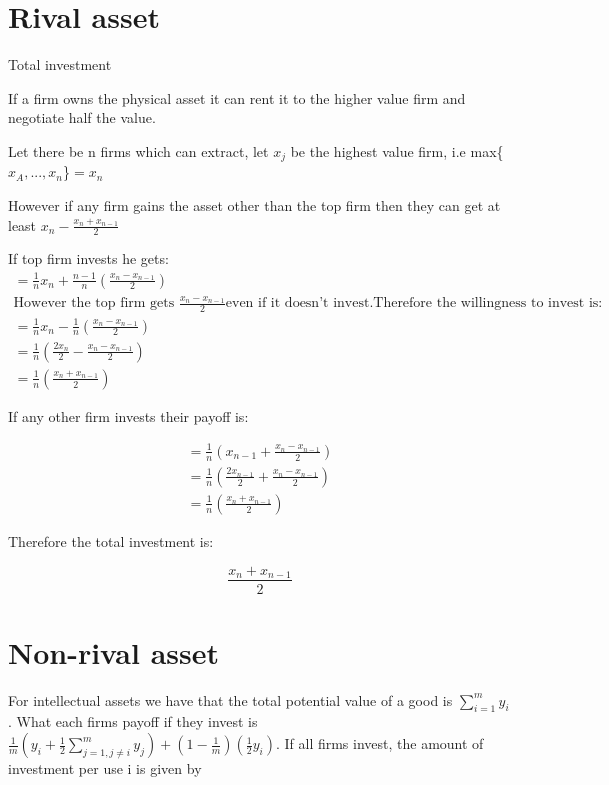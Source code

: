 \documentclass{article}
\begin{document}
\section*{Rival asset}
Total investment 

If a firm owns the physical asset it can rent it to the higher value firm and negotiate half the value. 

Let there be n firms which can extract, let $x_j$ be the highest value firm, i.e max\{$x_A,...,x_n$\}$=x_n$

However if any firm gains the asset other than the top firm then they can get at least $x_n-\frac{x_n+x_{n-1}}{2}$

If top firm invests he gets: 
\begin{align*}
=\frac{1}{n}x_n+\frac{n-1}{n}( \frac{x_n-x_{n-1}}{2} ) \\
\text{However the top firm gets  }\frac{x_n-x_{n-1}}{2} \text{even if it doesn't invest.Therefore the willingness to invest is:} \\
=\frac{1}{n}x_n-\frac{1}{n}( \frac{x_n-x_{n-1}}{2} ) \\
=\frac{1}{n}(\frac{2x_n}{2}-\frac{x_n-x_{n-1}}{2}) \\
=\frac{1}{n}(\frac{x_n+x_{n-1}}{2})
\end{align*}

If any other firm invests their payoff is:

\begin{align*}
=\frac{1}{n}( x_{n-1}+ \frac{x_n-x_{n-1}}{2} ) \\
=\frac{1}{n}( \frac{2x_{n-1}}{2}+ \frac{x_n-x_{n-1}}{2} ) \\
=\frac{1}{n}( \frac{x_n+x_{n-1}}{2} )
\end{align*}

Therefore the total investment is:

\begin{equation*}
\frac{x_n+x_{n-1}}{2}
\end{equation*}
\section*{Non-rival asset}

For intellectual assets we have that the total potential value of a good is $\sum_{i=1}^my_i$. What each firms payoff if they invest is $\frac{1}{m}(y_i+\frac{1}{2}\sum_{j=1,j\neq i}^my_j)+(1-\frac{1}{m})(\frac{1}{2}y_i)$. If all firms invest, the amount of investment per use i is given by 
\end{document}
